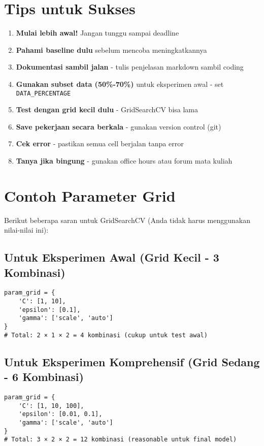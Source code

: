 \documentclass[12pt,a4paper]{article}
\begin{document}
\section{Tips untuk Sukses}

\begin{enumerate}
    \item \textbf{Mulai lebih awal!} Jangan tunggu sampai deadline
    \item \textbf{Pahami baseline dulu} sebelum mencoba meningkatkannya
    \item \textbf{Dokumentasi sambil jalan} - tulis penjelasan markdown sambil coding
    \item \textbf{Gunakan subset data (50\%-70\%)} untuk eksperimen awal - set \texttt{DATA\_PERCENTAGE}
    \item \textbf{Test dengan grid kecil dulu} - GridSearchCV bisa lama
    \item \textbf{Save pekerjaan secara berkala} - gunakan version control (git)
    \item \textbf{Cek error} - pastikan semua cell berjalan tanpa error
    \item \textbf{Tanya jika bingung} - gunakan office hours atau forum mata kuliah
\end{enumerate}

\section{Contoh Parameter Grid}

Berikut beberapa saran untuk GridSearchCV (Anda tidak harus menggunakan nilai-nilai ini):

\subsection{Untuk Eksperimen Awal (Grid Kecil - 3 Kombinasi)}
\begin{verbatim}
param_grid = {
    'C': [1, 10],
    'epsilon': [0.1],
    'gamma': ['scale', 'auto']
}
# Total: 2 × 1 × 2 = 4 kombinasi (cukup untuk test awal)
\end{verbatim}

\subsection{Untuk Eksperimen Komprehensif (Grid Sedang - 6 Kombinasi)}
\begin{verbatim}
param_grid = {
    'C': [1, 10, 100],
    'epsilon': [0.01, 0.1],
    'gamma': ['scale', 'auto']
}
# Total: 3 × 2 × 2 = 12 kombinasi (reasonable untuk final model)
\end{verbatim}
\end{document}
